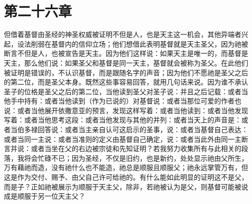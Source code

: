 
\section{第二十六章}

\par

但借着基督由圣经的神圣权威被证明不但是人，也是天主这一机会，其他异端者兴起，设法削弱在基督内的信仰立场；他们想借此表明基督就是天主圣父，因为祂被断言不但是人，也被宣告是天主。因为他们这样说：如果天主是唯一的，而基督是天主，那么他们说：如果圣父和基督是同一天主，基督就会被称为圣父。在此他们被证明是错误的，不认识基督，而是跟随名字的声音；因为他们不愿祂是圣父之后的第二位，而是圣父本身。既然这些事容易回答，就用几句话来说。因为谁不承认圣子的位格是圣父之后的第二位，当他读到圣父对圣子说：并且之后记载：或者当他手中持有：或者当他读到（作为已说的）对基督说：或者当那位可爱的作者也说：或者当他展开依撒意亚的预言，发现这样写着：或者当他读到：或者当他发现写着：或者当他思考这段：或者当他发现与其他的并列：或者当天上的声音是：或者当伯多禄回答说：或者当主亲自认可这启示的圣事，说：或者当基督自己表达：或者当同一主说：或者当准则的定义由基督自己确定，说：或者当此外由同一主断言并说：或者当坐在父的右边被宗徒和先知证明？若我努力收集所有与此相关的段落，我将会忙碌不已；因为圣经，不仅是旧约，也是新约，处处显示祂由父所生，万有藉祂而造，没有祂什么也不能造，祂总是顺服且顺服父；祂永远掌管万有，但这是作为交付、赐予、由父自己许可给祂的。有什么能如此明显的证明这不是父，而是子？正如祂被展示为顺服于天主父，除非，若祂被认为是父，则基督可能被说成是顺服于另一位天主父？\par

